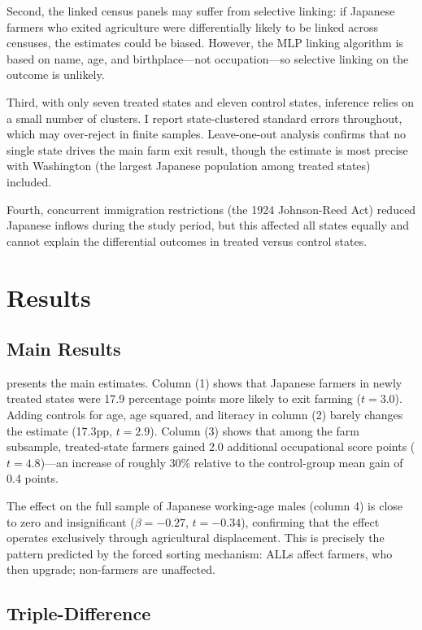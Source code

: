 \documentclass[12pt]{article}
\begin{document}
Second, the linked census panels may suffer from selective linking: if Japanese farmers who exited agriculture were differentially likely to be linked across censuses, the estimates could be biased. However, the MLP linking algorithm is based on name, age, and birthplace---not occupation---so selective linking on the outcome is unlikely.

Third, with only seven treated states and eleven control states, inference relies on a small number of clusters. I report state-clustered standard errors throughout, which may over-reject in finite samples. Leave-one-out analysis confirms that no single state drives the main farm exit result, though the estimate is most precise with Washington (the largest Japanese population among treated states) included.

Fourth, concurrent immigration restrictions (the 1924 Johnson-Reed Act) reduced Japanese inflows during the study period, but this affected all states equally and cannot explain the differential outcomes in treated versus control states.

\section{Results}

\subsection{Main Results}

 presents the main estimates. Column (1) shows that Japanese farmers in newly treated states were 17.9 percentage points more likely to exit farming ($t = 3.0$). Adding controls for age, age squared, and literacy in column (2) barely changes the estimate (17.3pp, $t = 2.9$). Column (3) shows that among the farm subsample, treated-state farmers gained 2.0 additional occupational score points ($t = 4.8$)---an increase of roughly 30\% relative to the control-group mean gain of 0.4 points.



The effect on the full sample of Japanese working-age males (column 4) is close to zero and insignificant ($\beta = -0.27$, $t = -0.34$), confirming that the effect operates exclusively through agricultural displacement. This is precisely the pattern predicted by the forced sorting mechanism: ALLs affect farmers, who then upgrade; non-farmers are unaffected.

\subsection{Triple-Difference}
\end{document}

